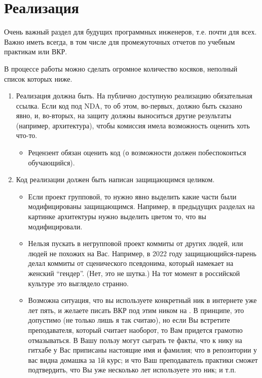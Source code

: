 
\section{Реализация}
Очень важный раздел для будущих программных инженеров, т.е. почти для всех. Важно иметь всегда, в том числе для промежуточных отчетов по учебным практикам или ВКР.

В процессе работы можно сделать огромное количество косяков, неполный список которых ниже.

\begin{enumerate}
  \item Реализация должна быть. На публично доступную реализацию обязательная ссылка. Если код под \textsc{NDA}, то об этом, во-первых, должно быть сказано явно, и, во-вторых, на защиту должны выно\-ситься другие результаты (например, архитектура), чтобы комис\-сия имела возможность оценить хоть что-то.
        \begin{itemize}
          \item  Рецензент обязан оценить код (о возможности должен побеспо\-коиться обучающийся).
        \end{itemize}
  \item Код реализации должен быть написан защищающимся целиком.
        \begin{itemize}
          \item  Если проект групповой, то нужно явно выделить какие части были модифицированы защищающимся. Например, в преды\-дущих разделах на картинке архитектуры нужно выделить цветом то, что вы модифицировали.
          \item Нельзя пускать в негрупповой проект коммиты от других людей, или людей не похожих на Вас. Например, в 2022 году защищающийся-парень делал коммиты от сценического псев\-донима, который намекает на женский \enquote{гендер}. (Нет, это не шутка.) На тот момент в российской культуре это выглядело странно.
          \item Возможна ситуация, что вы используете конкретный ник в интернете уже лет пять, и желаете писать ВКР под этим ником на \GitHub{}. В принципе, это допустимо (не только лишь я так считаю), но если Вы встретите преподавателя, который считает наоборот, то Вам придется грамотно отмазы\-ваться. В Вашу пользу могут сыграть те факты, что к нику на гитхабе у Вас приписаны настоящие имя и фамилия; что в репозитории у вас видна домашка за 1й курс; и что Ваш преподаватель практики сможет подтвердить, что Вы уже несколько лет используете это ник; и т.п.

\end{itemize}
\end{enumerate}
